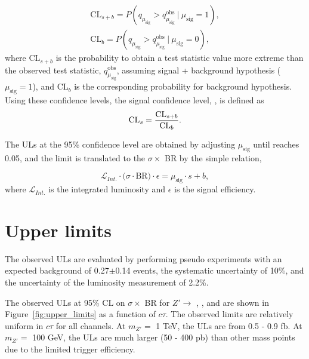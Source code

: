 \begin{align}
\mathrm{CL}_{s+b} = P(q_{\mu_{\mathrm{sig}}} > q_{\mu_{\mathrm{sig}}}^{\mathrm{obs}}~|~\mu_{\mathrm{sig}} = 1), \nonumber \\
\mathrm{CL}_{b} = P(q_{\mu_{\mathrm{sig}}} > q_{\mu_{\mathrm{sig}}}^{\mathrm{obs}}~|~\mu_{\mathrm{sig}} = 0),
\label{eq:p_values}
\end{align}
%
where $\mathrm{CL}_{s+b}$ is the probability to obtain a test statistic value more extreme than the observed test statistic, $q_{\mu_{\mathrm{sig}}}^{\mathrm{obs}}$, assuming signal + background hypothesis ($\mu_{\mathrm{sig}}=1$), and $\mathrm{CL}_{b}$ is the corresponding probability for background hypothesis. Using these confidence levels, the signal confidence level, \CLs, is defined as
\begin{align}
\mathrm{CL}_{s} =  \dfrac{\mathrm{CL}_{s+b}}{\mathrm{CL}_{b}}.
\label{eq:cls}
\end{align}

The ULs at the 95\% confidence level are obtained by adjusting $\mu_{\mathrm{sig}}$ until \CLs reaches 0.05, and the limit is translated to the $\sigma \times$ BR by the simple relation,

\begin{equation}
\label{eq:signal_strength}
\mathcal{L}_{Int.} \cdot \big(\sigma \cdot \mathrm{BR} \big) \cdot \epsilon = \mu_{\mathrm{sig}}\cdot s + b,
\end{equation}
%
where $\mathcal{L}_{Int.}$ is the integrated luminosity and  $\epsilon$ is the signal efficiency.

\section{Upper limits}
The observed ULs are evaluated by performing pseudo experiments with an expected background of 0.27$\pm$0.14 events, the systematic uncertainty of 10\%, and the uncertainty of the luminosity measurement of 2.2\%.

The observed ULs at 95\% CL on $\sigma \times$ BR for $Z' \rightarrow$ \mumu, \ee, and \emu are shown in Figure~\ref{fig:upper_limits} as a function of $c\tau$. The observed limits are relatively uniform in $c\tau$ for all channels. At $m_{Z'}=$ 1 TeV, the ULs are from 0.5 - 0.9 fb. At $m_{Z'}=$ 100 GeV, the ULs are much larger (50 - 400 pb) than other mass points due to the limited trigger efficiency.


